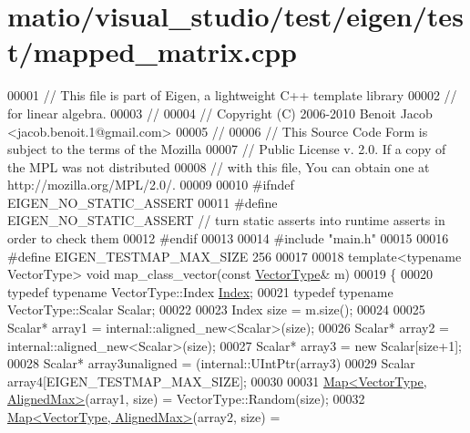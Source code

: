 \hypertarget{matio_2visual__studio_2test_2eigen_2test_2mapped__matrix_8cpp_source}{}\section{matio/visual\+\_\+studio/test/eigen/test/mapped\+\_\+matrix.cpp}
\label{matio_2visual__studio_2test_2eigen_2test_2mapped__matrix_8cpp_source}

\begin{DoxyCode}
00001 \textcolor{comment}{// This file is part of Eigen, a lightweight C++ template library}
00002 \textcolor{comment}{// for linear algebra.}
00003 \textcolor{comment}{//}
00004 \textcolor{comment}{// Copyright (C) 2006-2010 Benoit Jacob <jacob.benoit.1@gmail.com>}
00005 \textcolor{comment}{//}
00006 \textcolor{comment}{// This Source Code Form is subject to the terms of the Mozilla}
00007 \textcolor{comment}{// Public License v. 2.0. If a copy of the MPL was not distributed}
00008 \textcolor{comment}{// with this file, You can obtain one at http://mozilla.org/MPL/2.0/.}
00009 
00010 \textcolor{preprocessor}{#ifndef EIGEN\_NO\_STATIC\_ASSERT}
00011 \textcolor{preprocessor}{#define EIGEN\_NO\_STATIC\_ASSERT // turn static asserts into runtime asserts in order to check them}
00012 \textcolor{preprocessor}{#endif}
00013 
00014 \textcolor{preprocessor}{#include "main.h"}
00015 
00016 \textcolor{preprocessor}{#define EIGEN\_TESTMAP\_MAX\_SIZE 256}
00017 
00018 \textcolor{keyword}{template}<\textcolor{keyword}{typename} VectorType> \textcolor{keywordtype}{void} map\_class\_vector(\textcolor{keyword}{const} \hyperlink{struct_vector_type}{VectorType}& m)
00019 \{
00020   \textcolor{keyword}{typedef} \textcolor{keyword}{typename} VectorType::Index \hyperlink{namespace_eigen_a62e77e0933482dafde8fe197d9a2cfde}{Index};
00021   \textcolor{keyword}{typedef} \textcolor{keyword}{typename} VectorType::Scalar Scalar;
00022 
00023   Index size = m.size();
00024 
00025   Scalar* array1 = internal::aligned\_new<Scalar>(size);
00026   Scalar* array2 = internal::aligned\_new<Scalar>(size);
00027   Scalar* array3 = \textcolor{keyword}{new} Scalar[size+1];
00028   Scalar* array3unaligned = (internal::UIntPtr(array3)%
00029   Scalar  array4[EIGEN\_TESTMAP\_MAX\_SIZE];
00030 
00031   \hyperlink{group___core___module_class_eigen_1_1_map}{Map<VectorType, AlignedMax>}(array1, size) = VectorType::Random(size);
00032   \hyperlink{group___core___module_class_eigen_1_1_map}{Map<VectorType, AlignedMax>}(array2, size) = 

\end{DoxyCode}
